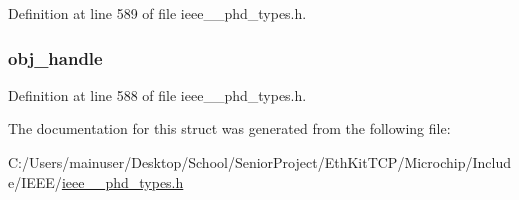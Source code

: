 Definition at line 589 of file ieee\+\_\+\_\+phd\+\_\+types.\+h.

\hypertarget{struct___get_argument_simple_abbfff52b7a4956021522f5750c4b32c6}{}
\subsubsection[{obj\+\_\+handle}]{ obj\+\_\+handle}\label{struct___get_argument_simple_abbfff52b7a4956021522f5750c4b32c6}


Definition at line 588 of file ieee\+\_\+\_\+phd\+\_\+types.\+h.



The documentation for this struct was generated from the following file\+:\begin{DoxyCompactItemize}
\item 
C\+:/\+Users/mainuser/\+Desktop/\+School/\+Senior\+Project/\+Eth\+Kit\+T\+C\+P/\+Microchip/\+Include/\+I\+E\+E\+E/\hyperlink{ieee__11073__phd__types_8h}{ieee\+\_\+\_\+phd\+\_\+types.\+h}\end{DoxyCompactItemize}

